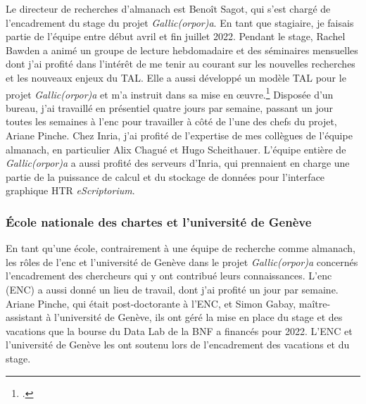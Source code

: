 \documentclass[class=article, crop=false]{standalone}
\begin{document}
Le directeur de recherches d'\acrshort{almanach} est Benoît Sagot, qui s'est chargé de l'encadrement du stage du projet \textit{Gallic(orpor)a}. En tant que stagiaire, je faisais partie de l'équipe entre début avril et fin juillet 2022. Pendant le stage, Rachel Bawden a animé un groupe de lecture hebdomadaire et des séminaires mensuelles dont j'ai profité dans l'intérêt de me tenir au courant sur les nouvelles recherches et les nouveaux enjeux du \acrshort{TAL}. Elle a aussi développé un modèle \acrshort{TAL} pour le projet \textit{Gallic(orpor)a} et m'a instruit dans sa mise en œuvre.\footcite{bawdenAutomaticNormalisationEarly2022, gabayFreEMcorporaFreEMnormFreEM2022} Disposée d'un bureau, j'ai travaillé en présentiel quatre jours par semaine, passant un jour toutes les semaines à l'\Gls{enc} pour travailler à côté de l'une des chefs du projet, Ariane Pinche. Chez \Gls{Inria}, j'ai profité de l'expertise de mes collègues de l'équipe \acrshort{almanach}, en particulier Alix Chagué et Hugo Scheithauer. L'équipe entière de \textit{Gallic(orpor)a} a aussi profité des serveurs d'\Gls{Inria}, qui prennaient en charge une partie de la puissance de calcul et du stockage de données pour l'interface graphique \acrshort{HTR} \textit{eScriptorium}.

\subsubsection{École nationale des chartes et l'université de Genève}
En tant qu'une école, contrairement à une équipe de recherche comme \acrshort{almanach}, les rôles de l'\Gls{enc} et l'université de Genève dans le projet \textit{Gallic(orpor)a} concernés l'encadrement des chercheurs qui y ont contribué leurs connaissances. L'\Gls{enc} (\acrshort{ENC}) a aussi donné un lieu de travail, dont j'ai profité un jour par semaine. Ariane Pinche, qui était post-doctorante à l'\acrlong{ENC}, et Simon Gabay, maître-assistant à l'université de Genève, ils ont géré la mise en place du stage et des vacations que la bourse du Data Lab de la \acrshort{BNF} a financés pour 2022. L'\acrshort{ENC} et l'université de Genève les ont soutenu lors de l'encadrement des vacations et du stage.
\end{document}
